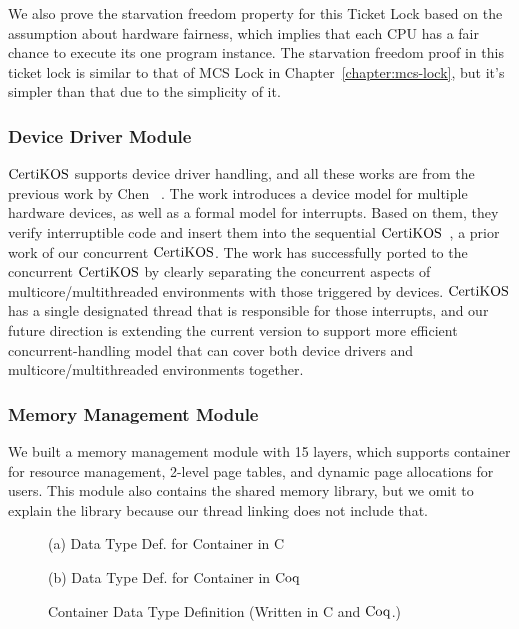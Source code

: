 We also prove the starvation freedom property for this Ticket Lock based on the assumption about hardware fairness,
which implies that each CPU has a fair chance to execute its one program instance.
The starvation freedom proof in this ticket lock is 
similar to that of MCS Lock in Chapter~\ref{chapter:mcs-lock}, but 
it's simpler than that due to the simplicity of it.

\subsubsection{Device Driver Module}

$\mathrm{CertiKOS}$ supports device driver handling, and all these works are from the previous work by  Chen \etal~\cite{certikos:interrupt}.
The work introduces a device model for multiple hardware devices,
as well as a formal model for interrupts. 
Based on them, they verify interruptible code and insert them into the sequential $\mathrm{CertiKOS}$~\cite{deepspec}, a prior work of our concurrent $\mathrm{CertiKOS}$. 
The work has  successfully ported to the concurrent $\mathrm{CertiKOS}$
by clearly separating the concurrent aspects of multicore/multithreaded environments
with those triggered by devices.
$\mathrm{CertiKOS}$ has a single designated thread that is responsible for those interrupts,
and our future direction is extending the current version to support more efficient concurrent-handling model that can cover both device drivers and multicore/multithreaded environments together.

\subsubsection{Memory Management Module}

We built a memory management module with 15 layers, 
which supports container for resource management, 2-level page tables, and dynamic page allocations for users.
This module also contains the shared memory library,
but we omit to explain the library because our thread linking does not include that. 


\begin{figure}
\begin{minipage}[t]{.45\textwidth}
\raggedright
 
\begin{center}
(a) Data Type Def. for Container in C
\end{center}
\end{minipage}
\hfill
\noindent
\begin{minipage}[t]{.45\textwidth}
\raggedleft
 
\begin{center}
(b) Data Type Def. for Container in $\mathrm{Coq}$
\end{center}
\end{minipage}
\caption{Container Data Type Definition (Written in C and $\mathrm{Coq}$.)}
\label{fig:chapter:certikos:container}
\end{figure}
